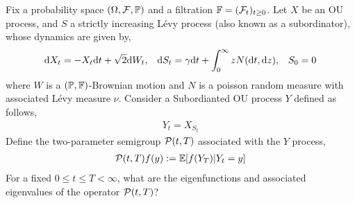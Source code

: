 \begin{problem}
    Fix a probability space \( (\Omega,\mathcal{F},\mathbb{P}) \) and a filtration \( \mathbb{F} = (\mathcal{F}_t)_{t\geq 0} \). Let \( X \) be an OU process, and \( S \) a strictly increasing L\'evy process (also known as a subordinator), whose dynamics are given by,
    \begin{align*}
        \mathrm{d} X_t = - X_t \mathrm{d} t + \sqrt{2}\mathrm{d} W_t, && \mathrm{d} S_t = \gamma \mathrm{d} t + \int_0^\infty z N(\mathrm{d} t,\mathrm{d} z), && S_0 = 0
    \end{align*}
    where \( W \) is a \( (\mathbb{P},\mathbb{F}) \)-Brownian motion and \( N \) is a poisson random measure with associated L\'evy measure \( \nu \). Consider a Subordianted OU process \( Y \) defined as follows,
    \begin{align*}
        Y_t = X_{S_t}
    \end{align*}
    Define the two-parameter semigroup \( \mathcal{P}(t,T) \) associated with the \( Y \) process,
    \begin{align*}
        \mathcal{P}(t,T) f(y) := \mathbb{E}[f(Y_T) | Y_t = y]
    \end{align*}
    For a fixed \( 0\leq t\leq T <\infty \), what are the eigenfunctions and associated eigenvalues of the operator \( \mathcal{P}(t,T) \)?
\end{problem}

